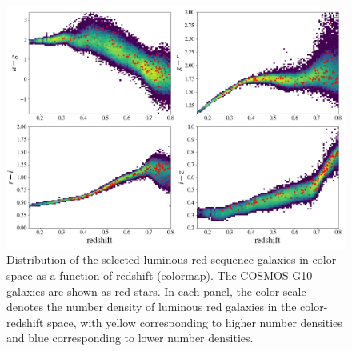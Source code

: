 \documentclass{aa}
\numberwithin{equation}{section}
\begin{document}
{%

\begin{figure}
\includegraphics[width=\textwidth]{figures_tmp/cosmos_color.png}
\caption{Distribution of the selected luminous red-sequence galaxies in color space as a function of redshift (colormap). The COSMOS-G10 galaxies are shown as red stars. In each panel, the color scale denotes the number density of luminous red galaxies in the color-redshift space, with yellow corresponding to higher number densities and blue corresponding to lower number densities.} 
\label{fig:cosmos_color}
\end{figure}

}
\end{document}
